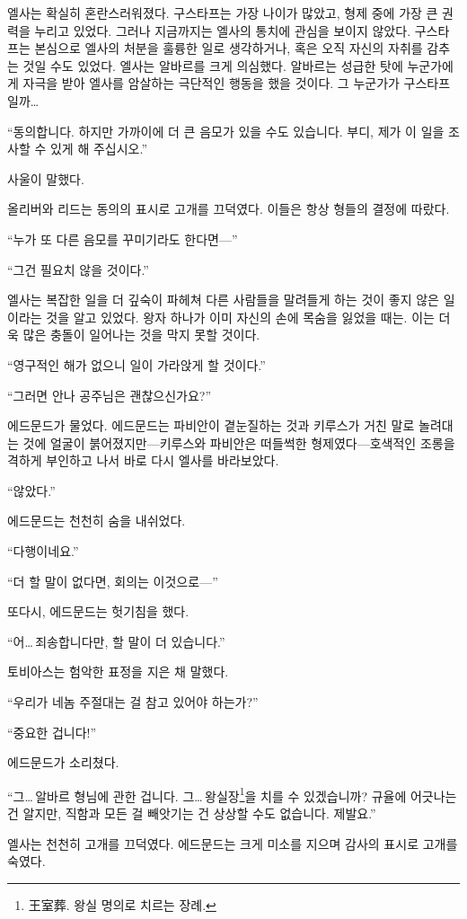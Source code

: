 엘사는 확실히 혼란스러워졌다. 구스타프는 가장 나이가 많았고, 형제 중에 가장 큰 권력을 누리고 있었다. 그러나 지금까지는 엘사의 통치에 관심을 보이지 않았다. 구스타프는 본심으로 엘사의 처분을 훌륭한 일로 생각하거나, 혹은 오직 자신의 자취를 감추는 것일 수도 있었다. 엘사는 알바르를 크게 의심했다. 알바르는 성급한 탓에 누군가에게 자극을 받아 엘사를 암살하는 극단적인 행동을 했을 것이다. 그 누군가가 구스타프일까\ldots

``동의합니다. 하지만 가까이에 더 큰 음모가 있을 수도 있습니다. 부디, 제가 이 일을 조사할 수 있게 해 주십시오.''

사울이 말했다.

올리버와 리드는 동의의 표시로 고개를 끄덕였다. 이들은 항상 형들의 결정에 따랐다.

``누가 또 다른 음모를 꾸미기라도 한다면—''

``그건 필요치 않을 것이다.''

엘사는 복잡한 일을 더 깊숙이 파헤쳐 다른 사람들을 말려들게 하는 것이 좋지 않은 일이라는 것을 알고 있었다. 왕자 하나가 이미 자신의 손에 목숨을 잃었을 때는. 이는 더욱 많은 충돌이 일어나는 것을 막지 못할 것이다.

``영구적인 해가 없으니 일이 가라앉게 할 것이다.''

``그러면 안나 공주님은 괜찮으신가요?''

에드문드가 물었다. 에드문드는 파비안이 곁눈질하는 것과 키루스가 거친 말로 놀려대는 것에 얼굴이 붉어졌지만—키루스와 파비안은 떠들썩한 형제였다—호색적인 조롱을 격하게 부인하고 나서 바로 다시 엘사를 바라보았다.

`` 않았다.''

에드문드는 천천히 숨을 내쉬었다.

``다행이네요.''

``더 할 말이 없다면, 회의는 이것으로—''

또다시, 에드문드는 헛기침을 했다.

``어\ldots\,죄송합니다만, 할 말이 더 있습니다.''

토비아스는 험악한 표정을 지은 채 말했다.

``우리가 네놈 주절대는 걸 참고 있어야 하는가?''

``중요한 겁니다!''

에드문드가 소리쳤다.

``그\ldots\,알바르 형님에 관한 겁니다. 그\ldots\,왕실장\footnote{王室葬. 왕실 명의로 치르는 장례.}을 치를 수 있겠습니까? 규율에 어긋나는 건 알지만, 직함과 모든 걸 빼앗기는 건 상상할 수도 없습니다. 제발요.''

엘사는 천천히 고개를 끄덕였다. 에드문드는 크게 미소를 지으며 감사의 표시로 고개를 숙였다.

